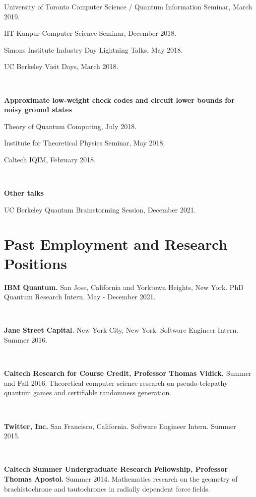 \documentclass[11pt]{article}
\begin{document}
University of Toronto Computer Science / Quantum Information Seminar, March 2019.

IIT Kanpur Computer Science Seminar, December 2018.

Simons Institute Industry Day Lightning Talks, May 2018.

UC Berkeley Visit Days, March 2018.

\

\textbf{Approximate low-weight check codes and circuit lower bounds for noisy ground states}

Theory of Quantum Computing, July 2018.

Institute for Theoretical Physics Seminar, May 2018.

Caltech IQIM, February 2018.

\

\textbf{Other talks}

UC Berkeley Quantum Brainstorming Session, December 2021.







\section{Past Employment and Research Positions}

\textbf{IBM Quantum.}
San Jose, California and Yorktown Heights, New York. PhD Quantum Research Intern. May - December 2021.

\

\textbf{Jane Street Capital.}
New York City, New York. Software Engineer Intern. Summer 2016. 

\

\textbf{Caltech Research for Course Credit, Professor Thomas Vidick.}
Summer and Fall 2016. Theoretical computer science research on pseudo-telepathy quantum games and certifiable randomness generation. 

\

\textbf{Twitter, Inc.}
San Francisco, California. Software Engineer Intern. Summer 2015. 

\	

\textbf{Caltech Summer Undergraduate Research Fellowship, Professor Thomas Apostol.}
Summer 2014. Mathematics research on the geometry of brachistochrone and tautochrones in radially dependent force fields. 
\end{document}
